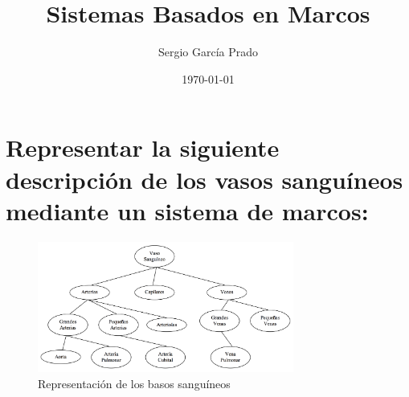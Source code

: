 \documentclass[10pt, a4paper,spanish]{article}
\title{\vspace{-15mm}\fontsize{24pt}{10pt}\selectfont\textbf{Sistemas Basados en Marcos}} %
\author{Sergio García Prado}
\date{\today}
\begin{document}
	\maketitle %

	\thispagestyle{fancy} %


  \section{Representar la siguiente descripción de los vasos sanguíneos mediante un sistema de marcos:}

		\begin{figure}[H]
			\begin{center}
				\includegraphics[width=0.75\textwidth]{diagram}
				\caption{Representación de los basos sanguíneos}
				\label{image:blood-vessel}
			\end{center}
		\end{figure}
\end{document}
